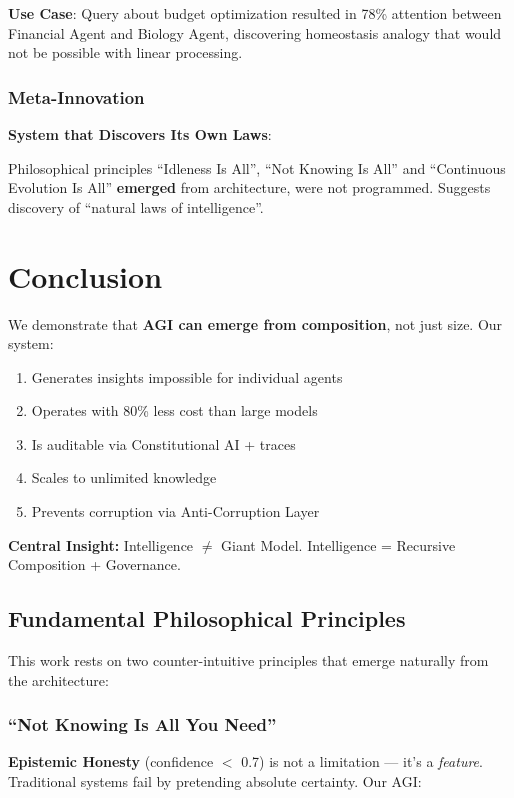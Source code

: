 \documentclass[11pt]{article}
\begin{document}
\textbf{Use Case}: Query about budget optimization resulted in 78\% attention between Financial Agent and Biology Agent, discovering homeostasis analogy that would not be possible with linear processing.

\subsubsection{Meta-Innovation}

\textbf{System that Discovers Its Own Laws}:

Philosophical principles ``Idleness Is All'', ``Not Knowing Is All'' and ``Continuous Evolution Is All'' \textbf{emerged} from architecture, were not programmed. Suggests discovery of ``natural laws of intelligence''.

\section{Conclusion}

We demonstrate that \textbf{AGI can emerge from composition}, not just size. Our system:

\begin{enumerate}
    \item Generates insights impossible for individual agents
    \item Operates with 80\% less cost than large models
    \item Is auditable via Constitutional AI + traces
    \item Scales to unlimited knowledge
    \item Prevents corruption via Anti-Corruption Layer
\end{enumerate}

\textbf{Central Insight:} Intelligence $\neq$ Giant Model. Intelligence = Recursive Composition + Governance.

\subsection{Fundamental Philosophical Principles}

This work rests on two counter-intuitive principles that emerge naturally from the architecture:

\subsubsection{``Not Knowing Is All You Need''}

\textbf{Epistemic Honesty} (confidence $<$ 0.7) is not a limitation --- it's a \textit{feature}. Traditional systems fail by pretending absolute certainty. Our AGI:
\end{document}
